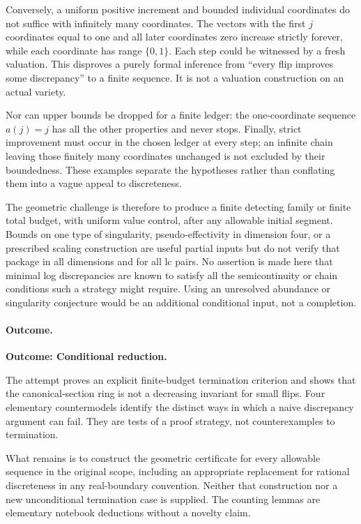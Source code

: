 \documentclass[11pt,a4paper]{article}
\numberwithin{equation}{section}
\begin{document}
Conversely, a uniform positive increment and bounded individual coordinates
do not suffice with infinitely many coordinates. The vectors with the
first $j$ coordinates equal to one and all later coordinates zero increase
strictly forever, while each coordinate has range $\{0,1\}$. Each step
could be witnessed by a fresh valuation. This disproves a purely formal
inference from ``every flip improves some discrepancy'' to a finite
sequence. It is not a valuation construction on an actual variety.

Nor can upper bounds be dropped for a finite ledger: the one-coordinate
sequence $a(j)=j$ has all the other properties and never stops. Finally,
strict improvement must occur in the chosen ledger at every step; an
infinite chain leaving those finitely many coordinates unchanged is not
excluded by their boundedness. These examples separate the hypotheses
rather than conflating them into a vague appeal to discreteness.

The geometric challenge is therefore to produce a finite detecting family
or finite total budget, with uniform value control, after any allowable
initial segment. Bounds on one type of singularity, pseudo-effectivity in
dimension four, or a prescribed scaling construction are useful partial
inputs but do not verify that package in all dimensions and for all lc
pairs. No assertion is made here that minimal log discrepancies are known
to satisfy all the semicontinuity or chain conditions such a strategy might
require. Using an unresolved abundance or singularity conjecture would be
an additional conditional input, not a completion.

\paragraph{Outcome.}
\textbf{Outcome: Conditional reduction.}

The attempt proves an explicit finite-budget termination criterion and
shows that the canonical-section ring is not a decreasing invariant for
small flips. Four elementary countermodels identify the distinct ways in
which a naive discrepancy argument can fail. They are tests of a proof
strategy, not counterexamples to termination.

What remains is to construct the geometric certificate for every allowable
sequence in the original scope, including an appropriate replacement for
rational discreteness in any real-boundary convention. Neither that
construction nor a new unconditional termination case is supplied. The
counting lemmas are elementary notebook deductions without a novelty claim.
\end{document}

